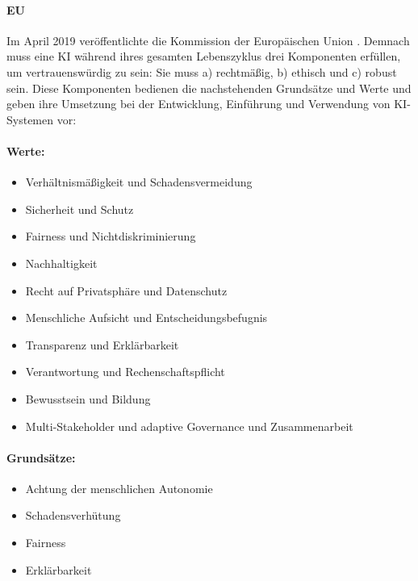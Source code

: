 \documentclass[12pt]{report}
\begin{document}
\paragraph{EU\cite{EUCommision}\\}
Im April 2019 veröffentlichte die Kommission der Europäischen Union \cite{EUCommision}.
Demnach muss eine KI während ihres gesamten Lebenszyklus drei Komponenten erfüllen, um vertrauenswürdig zu sein: Sie muss a) rechtmäßig, b) ethisch und c) robust sein. Diese Komponenten bedienen die nachstehenden Grundsätze und Werte und geben ihre Umsetzung bei der Entwicklung, Einführung und Verwendung von KI-Systemen vor:

\paragraph{Werte:}
\begin{itemize}
	\item  Verhältnismäßigkeit und Schadensvermeidung
	\item  Sicherheit und Schutz
	\item  Fairness und Nichtdiskriminierung
	\item  Nachhaltigkeit
	\item  Recht auf Privatsphäre und Datenschutz
	\item  Menschliche Aufsicht und Entscheidungsbefugnis
	\item  Transparenz und Erklärbarkeit
	\item  Verantwortung und Rechenschaftspflicht
	\item  Bewusstsein und Bildung
	\item Multi-Stakeholder und adaptive Governance und Zusammenarbeit
\end{itemize}

\paragraph{Grundsätze:}
\begin{itemize}
	\item  Achtung der menschlichen Autonomie
	\item  Schadensverhütung
	\item  Fairness
	\item  Erklärbarkeit
\end{itemize}
\end{document}
